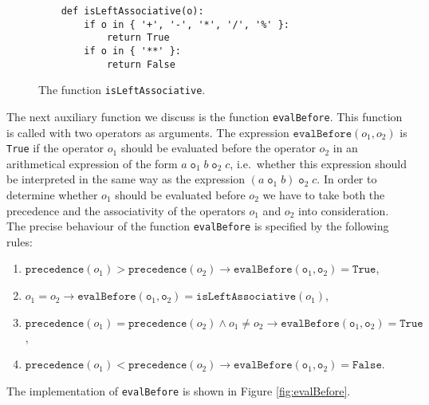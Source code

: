 \begin{figure}[!ht]
\centering
\begin{verbatim}
    def isLeftAssociative(o):
        if o in { '+', '-', '*', '/', '%' }:
            return True
        if o in { '**' }:
            return False
\end{verbatim}
\vspace*{-0.3cm}
\caption{The function \texttt{isLeftAssociative}.}
\label{fig:isLeftAssociative}
\end{figure}
The next auxiliary function we discuss is the function \texttt{evalBefore}.  This function is called with two
operators as arguments.  The expression $\texttt{evalBefore}(o_1, o_2)$ is \texttt{True}
if the operator $o_1$ should be evaluated before the operator $o_2$ in an arithmetical expression of the form
$a \;\texttt{o}_1\; b \;\texttt{o}_2\; c$, i.e.~whether this expression should be interpreted in the same way
as the expression $(a \;\texttt{o}_1\; b) \;\texttt{o}_2\; c$.  In order to determine whether $o_1$ should be
evaluated before $o_2$ we have to take both the precedence and the associativity of the operators $o_1$ and $o_2$ into
consideration.   The precise behaviour of the function \texttt{evalBefore} is specified by the following rules:
\begin{enumerate}
\item $\texttt{precedence}(o_1) > \texttt{precedence}(o_2) \rightarrow 
      \texttt{evalBefore}(\texttt{o}_1, \texttt{o}_2) = \texttt{True}$,
\item $o_1 = o_2 \rightarrow \texttt{evalBefore}(\texttt{o}_1, \texttt{o}_2) = \texttt{isLeftAssociative}(o_1)$,
\item $\texttt{precedence}(o_1) = \texttt{precedence}(o_2) \wedge o_1 \not= o_2 \rightarrow 
       \texttt{evalBefore}(\texttt{o}_1, \texttt{o}_2) = \texttt{True}$,
\item $\texttt{precedence}(o_1) < \texttt{precedence}(o_2) \rightarrow 
       \texttt{evalBefore}(\texttt{o}_1, \texttt{o}_2) = \texttt{False}$.
\end{enumerate}
The implementation of \texttt{evalBefore} is shown in Figure \ref{fig:evalBefore}.

